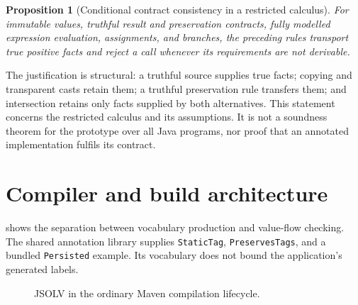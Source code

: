 \documentclass[11pt]{article}
\newtheorem{proposition}{Proposition}
\begin{document}
\begin{proposition}[Conditional contract consistency in a restricted calculus]
For immutable values, truthful result and preservation contracts, fully modelled
expression evaluation, assignments, and branches, the preceding rules transport
true positive facts and reject a call whenever its requirements are not derivable.
\end{proposition}
\noindent
The justification is structural: a truthful source supplies true facts; copying
and transparent casts retain them; a truthful preservation rule transfers them;
and intersection retains only facts supplied by both alternatives. This statement
concerns the restricted calculus and its assumptions. It is not a soundness
theorem for the prototype over all Java programs, nor proof that an annotated
implementation fulfils its contract.

\section{Compiler and build architecture}

 shows the separation between vocabulary production and
value-flow checking. The shared annotation library supplies \texttt{StaticTag},
\texttt{PreservesTags}, and a bundled \texttt{Persisted} example. Its vocabulary
does not bound the application's generated labels.

\begin{figure}[htbp]
\centering
{}
\caption{JSOLV in the ordinary Maven compilation lifecycle.}
\label{fig:architecture}
\end{figure}
\end{document}
